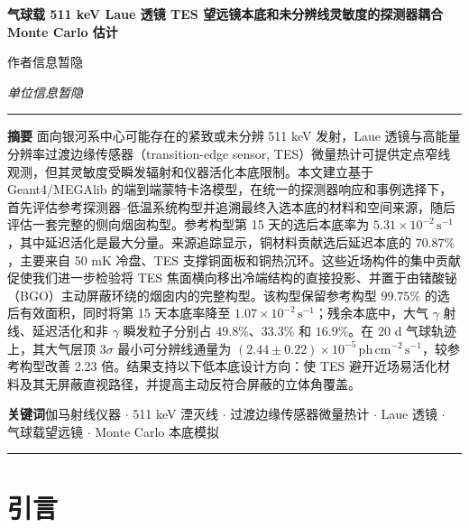 \documentclass[11pt]{article}
\newcommand{\revblue}[1]{\textcolor{revisionblue}{#1}}
\newcommand{\phcms}{\,\mathrm{ph\,cm^{-2}\,s^{-1}}}
\newcommand{\cps}{\,\mathrm{s^{-1}}}
\begin{document}
\thispagestyle{fancy}
\begin{flushleft}
{\LARGE\bfseries 气球载 511 keV Laue 透镜 TES 望远镜本底和未分辨线灵敏度的探测器耦合 Monte Carlo 估计 \par}
\vspace{1.1em}
{\large 作者信息暂隐\par}
\vspace{0.3em}
{\normalsize\itshape 单位信息暂隐\par}
\end{flushleft}
\vspace{0.7em}
\noindent\rule{\textwidth}{0.4pt}
\vspace{0.5em}

\noindent\textbf{摘要}\hspace{0.7em}
面向银河系中心可能存在的紧致或未分辨 511 keV 发射，Laue 透镜与高能量分辨率过渡边缘传感器（transition-edge sensor, TES）微量热计可提供定点窄线观测，但其灵敏度受瞬发辐射和仪器活化本底限制。本文建立基于 Geant4/MEGAlib 的端到端蒙特卡洛模型，在统一的探测器响应和事例选择下，首先评估参考探测器--低温系统构型并追溯最终入选本底的材料和空间来源，随后评估一套完整的侧向烟囱构型。参考构型第 15 天的选后本底率为 $5.31\times10^{-2}\cps$，其中延迟活化是最大分量。来源追踪显示，铜材料贡献选后延迟本底的 $70.87\%$，主要来自 50 mK 冷盘、TES 支撑铜面板和铜热沉环。这些近场构件的集中贡献促使我们进一步检验将 TES 焦面横向移出冷端结构的直接投影、并置于由锗酸铋（BGO）主动屏蔽环绕的烟囱内的完整构型。该构型保留参考构型 $99.75\%$ 的选后有效面积，同时将第 15 天本底率降至 $1.07\times10^{-2}\cps$；残余本底中，\revblue{大气 $\gamma$ 射线}、延迟活化和非 $\gamma$ 瞬发粒子分别占 $49.8\%$、$33.3\%$ 和 $16.9\%$。在 20 d 气球轨迹上，其大气层顶 $3\sigma$ 最小可分辨线通量为 $(2.44\pm0.22)\times10^{-5}\phcms$，较参考构型改善 2.23 倍。结果支持以下低本底设计方向：使 TES 避开近场易活化材料及其无屏蔽直视路径，并提高主动反符合屏蔽的立体角覆盖。

\vspace{0.7em}
\noindent\textbf{关键词}\hspace{0.7em}伽马射线仪器 $\cdot$ 511 keV 湮灭线 $\cdot$ 过渡边缘传感器微量热计 $\cdot$ Laue 透镜 $\cdot$ 气球载望远镜 $\cdot$ Monte Carlo 本底模拟

\vspace{0.3em}
\noindent\rule{\textwidth}{0.4pt}
\vspace{1.0em}

\section{引言}
\label{sec:intro}
\end{document}

